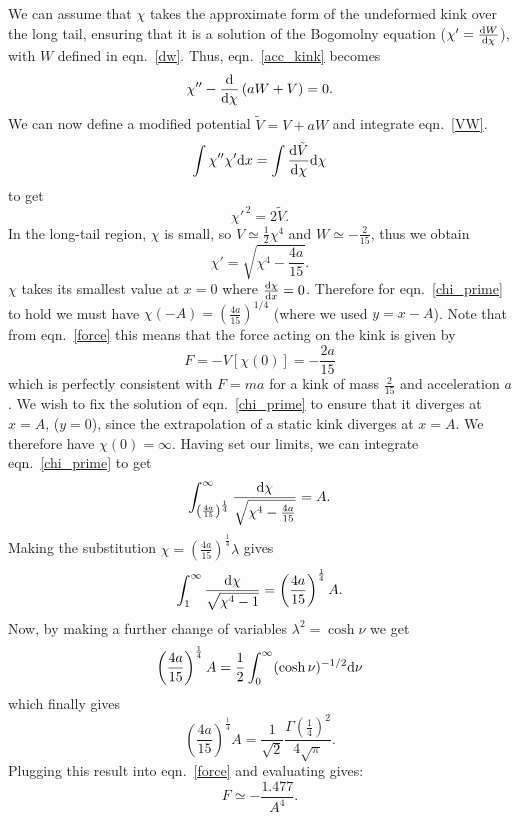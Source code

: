 \documentclass[11pt, oneside]{article}  	%
\numberwithin{equation}{section}
\newcommand{\drv}{\ensuremath{\textup{d}}}
\begin{document}
We can assume that $\chi$ takes the approximate form of the undeformed kink over the long tail, ensuring that it is a solution of the Bogomolny equation ($\chi' = \frac{\drv W }{\drv \chi}$), with $W$ defined in eqn.~\ref{dw}. Thus, eqn.~\ref{acc_kink} becomes
\begin{equation}\label{VW}
\chi'' -\frac{\drv}{\drv \chi}\left ( aW + V \right ) =0.
\end{equation}
We can now define a modified potential $\tilde{V} = V +aW$ and integrate eqn.~\ref{VW}.
\begin{equation}
\int \chi'' \chi' \drv x = \int \frac{\drv \tilde{V}}{\drv \chi} \drv \chi
\end{equation}
to get
\begin{equation}
\chi'^{\,2} = 2 \tilde{V}.
\end{equation}
In the long-tail region, $\chi$ is small, so $V\simeq \frac{1}{2}\chi^4$ and $W\simeq -\frac{2}{15}$, thus we obtain
\begin{equation}\label{chi_prime}
\chi' = \sqrt{\chi^4 - \frac{4a}{15}}.
\end{equation}
$\chi$ takes its smallest value at $x=0$ where $\frac{\drv\chi}{\drv x}=0$. Therefore for eqn.~\ref{chi_prime} to hold we must have $\chi(-A) = \left( \frac{4a}{15} \right)^{1/4}$ (where we used $y = x-A$). Note that from eqn.~\ref{force} this means that the force acting on the kink is given by
\begin{equation}
F = -V\left[\chi(0)\right] = -\frac{2a}{15}
\end{equation}
which is perfectly consistent with $F = ma$ for a kink of mass $\frac{2}{15}$ and acceleration $a$. We wish to fix the solution of eqn.~\ref{chi_prime} to ensure that it diverges at $x = A$, ($y = 0$), since the extrapolation of a static kink diverges at $x=A$. We therefore have $\chi(0) = \infty$. Having set our limits, we can integrate eqn.~\ref{chi_prime} to get
\begin{equation}
\int_{ \left( \frac{4a}{15} \right)^{\frac{1}{4}}}^{\infty}\frac{\drv \chi}{\sqrt{\chi^4 - \frac{4a}{15}}} = A.
\end{equation}
Making the substitution $\chi =\left( \frac{4a}{15}\right)^{\frac{1}{4}}\lambda$ gives
\begin{equation}
 \int_{1}^{\infty}\frac{\drv \chi}{\sqrt{\chi^4 - 1}} = \left( \frac{4a}{15}\right)^{\frac{1}{4}} A.
\end{equation}
Now, by making a further change of variables $\lambda^2 = \cosh\nu$ we get
\begin{equation}
 \left( \frac{4a}{15}\right)^{\frac{1}{4}} A = \frac{1}{2}\int_{0}^{\infty} (\cosh\nu)^{-1/2}\drv \nu
\end{equation}
which finally gives
\begin{equation}
 \left( \frac{4a}{15}\right)^{\frac{1}{4}} A =\frac{1}{\sqrt{2}}\frac{\Gamma \left( \frac{1}{4}\right)^2}{4\sqrt{\pi}}.
\end{equation}
Plugging this result into eqn.~\ref{force} and evaluating gives:
\begin{equation} \label{prediction}
F \simeq -\frac{1.477}{A^4}.
\end{equation}
\end{document}

